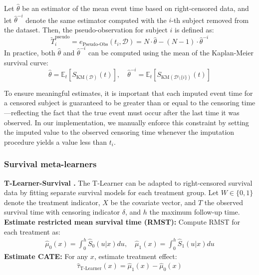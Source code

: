 Let \( \hat{\theta} \) be an estimator of the mean event time based on right-censored data, and let \( \hat{\theta}^{-i} \) denote the same estimator computed with the \( i \)-th subject removed from the dataset.
Then, the pseudo-observation for subject \( i \) is defined as:
\begin{equation}
\tilde{T}^{\text{pseudo}}_i = e_{\text{Pseudo-Obs}}(t_i, \mathcal{D}) 
= N \cdot \hat{\theta} - (N - 1) \cdot \hat{\theta}^{-i}
\end{equation}
In practice, both \( \hat{\theta} \) and \( \hat{\theta}^{-i} \) can be computed using the mean of the Kaplan-Meier survival curve:
\[
\hat{\theta} = \mathbb{E}_t[S_{\text{KM}(\mathcal{D})}(t)], \quad
\hat{\theta}^{-i} = \mathbb{E}_t[S_{\text{KM}(\mathcal{D} \setminus \{i\})}(t)]
\]

To ensure meaningful estimates, it is important that each imputed event time for a censored subject is guaranteed to be greater than or equal to the censoring time---reflecting the fact that the true event must occur after the last time it was observed. 
In our implementation, we manually enforce this constraint by setting the imputed value to the observed censoring time whenever the imputation procedure yields a value less than \( t_i \).

\subsubsection{Survival meta-learners}\label{ch04:app:survival-meta-learners}

\textbf{T-Learner-Survival \citep{bo2024ameta,noroozizadeh2025impact}.}
The T-Learner can be adapted to right-censored survival data by fitting separate survival models for each treatment group.
Let $W \in \{0, 1\}$ denote the treatment indicator, $X$ be the covariate vector, and $T$ the observed survival time with censoring indicator $\delta$, and $h$ the maximum follow-up time.
\textbf{Estimate restricted mean survival time (RMST):} Compute RMST for each treatment as:
    \begin{align*}
        \widehat{\mu}_0(x) = \int_0^h \widehat{S}_0(u|x) du, \quad \widehat{\mu}_1(x) = \int_0^h \widehat{S}_1(u|x) du
    \end{align*}
\textbf{Estimate CATE:} For any $x$, estimate treatment effect:
    \begin{align*}
        \widehat{\tau}_{\text{T-Learner}}(x) = \widehat{\mu}_1(x) - \widehat{\mu}_0(x)
    \end{align*}

